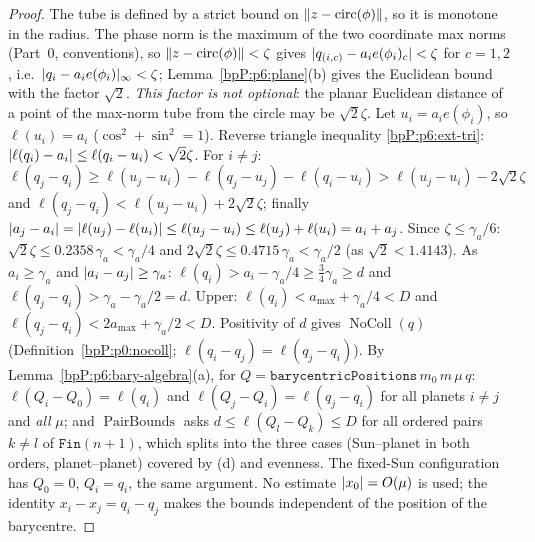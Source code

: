 \begin{proof}
\label{stepP:p6:tg-a} The tube is defined by a strict bound on $\lVert z-\operatorname{circ}(\phi)\rVert$, so it is monotone in the radius.
\label{stepP:p6:tg-b} The phase norm is the maximum of the two coordinate max norms (Part~0, conventions), so $\lVert z-\operatorname{circ}(\phi)\rVert<\zeta$ gives $\lvert q_{(i,c)}-a_ie(\phi_i)_c\rvert<\zeta$ for $c=1,2$, i.e.\ $\lvert q_i-a_ie(\phi_i)\rvert_\infty<\zeta$; Lemma~\ref{bpP:p6:plane}(b) gives the Euclidean bound with the factor $\sqrt2$. \emph{This factor is not optional}: the planar Euclidean distance of a point of the max-norm tube from the circle may be $\sqrt2\zeta$.
\label{stepP:p6:tg-c} Let $u_i=a_ie(\phi_i)$, so $\ell(u_i)=a_i$ ($\cos^2+\sin^2=1$). Reverse triangle inequality \ref{bpP:p6:ext-tri}: $\lvert \ell(q_i)-a_i\rvert\le\ell(q_i-u_i)<\sqrt2\zeta$. For $i\ne j$: $\ell(q_j-q_i)\ge\ell(u_j-u_i)-\ell(q_j-u_j)-\ell(q_i-u_i)>\ell(u_j-u_i)-2\sqrt2\zeta$ and $\ell(q_j-q_i)<\ell(u_j-u_i)+2\sqrt2\zeta$; finally $\lvert a_j-a_i\rvert=\lvert \ell(u_j)-\ell(u_i)\rvert\le\ell(u_j-u_i)\le\ell(u_j)+\ell(u_i)=a_i+a_j$.
\label{stepP:p6:tg-d} Since $\zeta\le\gamma_a/6$: $\sqrt2\zeta\le0.2358\,\gamma_a<\gamma_a/4$ and $2\sqrt2\zeta\le0.4715\,\gamma_a<\gamma_a/2$ (as $\sqrt2<1.4143$). As $a_i\ge\gamma_a$ and $\lvert a_i-a_j\rvert\ge\gamma_a$: $\ell(q_i)>a_i-\gamma_a/4\ge\tfrac34\gamma_a\ge d$ and $\ell(q_j-q_i)>\gamma_a-\gamma_a/2=d$. Upper: $\ell(q_i)<a_{\max}+\gamma_a/4<D$ and $\ell(q_j-q_i)<2a_{\max}+\gamma_a/2<D$. Positivity of $d$ gives $\operatorname{NoColl}(q)$ (Definition~\ref{bpP:p0:nocoll}; $\ell(q_i-q_j)=\ell(q_j-q_i)$).
\label{stepP:p6:tg-e} By Lemma~\ref{bpP:p6:bary-algebra}(a), for $Q=\texttt{barycentricPositions}\,m_0\,m\,\mu\,q$: $\ell(Q_i-Q_0)=\ell(q_i)$ and $\ell(Q_j-Q_i)=\ell(q_j-q_i)$ for all planets $i\ne j$ and \emph{all} $\mu$; and $\operatorname{PairBounds}$ asks $d\le\ell(Q_l-Q_k)\le D$ for all ordered pairs $k\ne l$ of $\texttt{Fin}(n+1)$, which splits into the three cases (Sun--planet in both orders, planet--planet) covered by (d) and evenness. The fixed-Sun configuration has $Q_0=0$, $Q_i=q_i$, the same argument. No estimate $\lvert x_0\rvert=O(\mu)$ is used; the identity $x_i-x_j=q_i-q_j$ makes the bounds independent of the position of the barycentre.
\end{proof}
